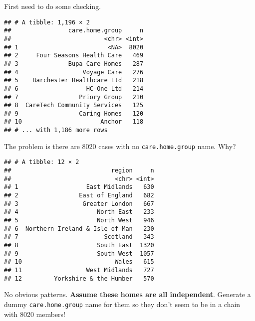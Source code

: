 \documentclass[]{article}
\newenvironment{Shaded}{\begin{snugshade}}{\end{snugshade}}
\newcommand{\KeywordTok}[1]{\textcolor[rgb]{0.13,0.29,0.53}{\textbf{{#1}}}}
\newcommand{\DataTypeTok}[1]{\textcolor[rgb]{0.13,0.29,0.53}{{#1}}}
\newcommand{\StringTok}[1]{\textcolor[rgb]{0.31,0.60,0.02}{{#1}}}
\newcommand{\OtherTok}[1]{\textcolor[rgb]{0.56,0.35,0.01}{{#1}}}
\newcommand{\NormalTok}[1]{{#1}}
\begin{document}
First need to do some checking.

\begin{Shaded}
\end{Shaded}

\begin{verbatim}
## # A tibble: 1,196 × 2
##                care.home.group     n
##                          <chr> <int>
## 1                         <NA>  8020
## 2     Four Seasons Health Care   469
## 3              Bupa Care Homes   287
## 4                  Voyage Care   276
## 5    Barchester Healthcare Ltd   218
## 6                   HC-One Ltd   214
## 7                 Priory Group   210
## 8  CareTech Community Services   125
## 9                 Caring Homes   120
## 10                      Anchor   118
## # ... with 1,186 more rows
\end{verbatim}

The problem is there are 8020 cases with no \texttt{care.home.group}
name. Why?

\begin{Shaded}
\end{Shaded}

\begin{verbatim}
## # A tibble: 12 × 2
##                            region     n
##                             <chr> <int>
## 1                   East Midlands   630
## 2                 East of England   682
## 3                  Greater London   667
## 4                      North East   233
## 5                      North West   946
## 6  Northern Ireland & Isle of Man   230
## 7                        Scotland   343
## 8                      South East  1320
## 9                      South West  1057
## 10                          Wales   615
## 11                  West Midlands   727
## 12         Yorkshire & the Humber   570
\end{verbatim}

No obvious patterns. \textbf{Assume these homes are all independent}.
Generate a dummy \texttt{care.home.group} name for them so they don't
seem to be in a chain with 8020 members!
\end{document}
